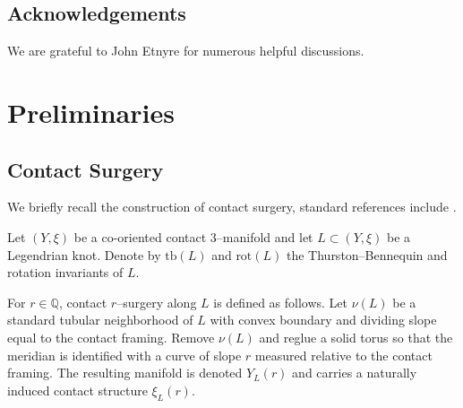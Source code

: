 \documentclass[12pt]{amsart}
\newtheorem{conjecture}[theorem]{Conjecture}
\theoremstyle{definition}
\theoremstyle{definition}
\newcommand{\rot}{\text{rot}}
\newcommand{\tb}{\text{tb}}
\begin{document}

	\subsection*{Acknowledgements}
We are grateful to John Etnyre for numerous helpful discussions.	
\section{Preliminaries}

\subsection{Contact Surgery}

We briefly recall the construction of contact surgery,
standard references include \cite{DingGeiges04,Geiges08,Honda00}.

Let $(Y,\xi)$ be a co-oriented contact $3$–manifold and
let $L\subset (Y,\xi)$ be a Legendrian knot.
Denote by $\tb(L)$ and $\rot(L)$ the
Thurston–Bennequin and rotation invariants of $L$.

For $r\in\mathbb{Q}$, contact $r$–surgery along $L$
is defined as follows.
Let $\nu(L)$ be a standard tubular neighborhood of $L$
with convex boundary and dividing slope equal to the contact framing.
Remove $\nu(L)$ and reglue a solid torus so that the meridian
is identified with a curve of slope $r$ measured relative to
the contact framing.
The resulting manifold is denoted $Y_L(r)$ and carries a
naturally induced contact structure $\xi_L(r)$.
\end{document}

